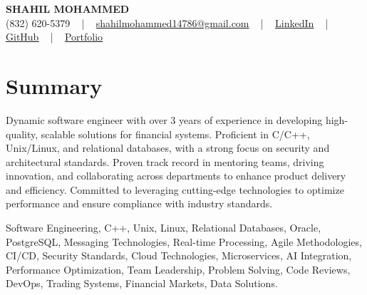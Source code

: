 \documentclass[letterpaper,10pt]{article}
\begin{document}
\begin{center}
    {\fontsize{14pt}{12pt}\selectfont \textbf{\MakeUppercase{Shahil Mohammed}}}\\ \vspace{2pt}
    \fontsize{10pt}{12pt}\selectfont (832) 620-5379 ~ | ~ \href{mailto:shahilmohammed14786@gmail.com}{shahilmohammed14786@gmail.com} ~ | ~  
    \href{https://www.linkedin.com/in/shahil-mohammed-9652931a1/}{\color{blue}\underline{LinkedIn}}  ~ | ~ 
    \href{https://github.com/freakbeast14}{\color{blue}\underline{GitHub}} ~ | ~ 
    \href{https://shahil-mohammed.netlify.app/}{\color{blue}\underline{Portfolio}}
    \vspace{-8pt}
\end{center}

\section{Summary}
\vspace{-2pt}\fontsize{8pt}{9pt}\selectfont
Dynamic software engineer with over 3 years of experience in developing high-quality, scalable solutions for financial systems. Proficient in C/C++, Unix/Linux, and relational databases, with a strong focus on security and architectural standards. Proven track record in mentoring teams, driving innovation, and collaborating across departments to enhance product delivery and efficiency. Committed to leveraging cutting-edge technologies to optimize performance and ensure compliance with industry standards. 
 \vspace{-5pt}
 
{\fontsize{1pt}{1pt}\selectfont\color{white}
Software Engineering, C++, Unix, Linux, Relational Databases, Oracle, PostgreSQL, Messaging Technologies, Real-time Processing, Agile Methodologies, CI/CD, Security Standards, Cloud Technologies, Microservices, AI Integration, Performance Optimization, Team Leadership, Problem Solving, Code Reviews, DevOps, Trading Systems, Financial Markets, Data Solutions.
}
\vspace{-8pt}

\vspace{-2pt}
\end{document}

